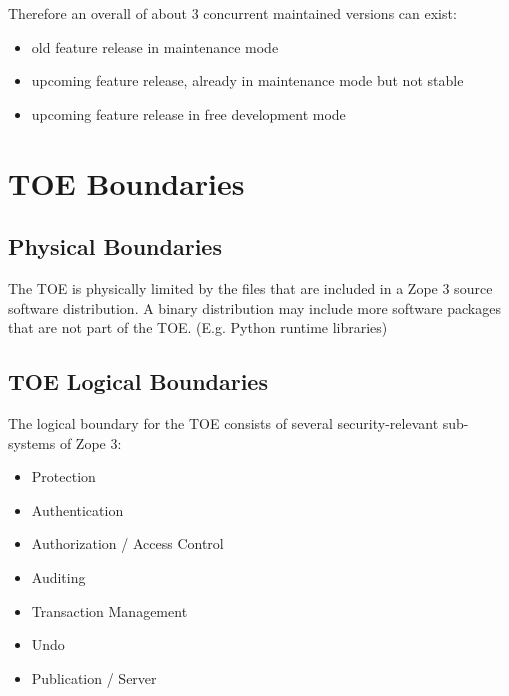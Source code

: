 \documentclass[12pt,english]{scrbook}
\begin{document}
Therefore an overall of about 3 concurrent maintained versions can exist:

\begin{itemize}
  
  \item old feature release in maintenance mode

  \item upcoming feature release, already in maintenance mode but not stable

  \item upcoming feature release in free development mode

\end{itemize}





\section{TOE Boundaries}





\subsection{Physical Boundaries}

The TOE is physically limited by the files that are included in a Zope 3
source software distribution. A binary distribution may include more software
packages that are not part of the TOE. (E.g. Python runtime libraries)





\subsection{TOE Logical Boundaries}

The logical boundary for the TOE consists of several security-relevant
sub-systems of Zope 3:

\begin{itemize}

  \item Protection

  \item Authentication

  \item Authorization / Access Control

  \item Auditing

  \item Transaction Management

  \item Undo

  \item Publication / Server

\end{itemize}
\end{document}
